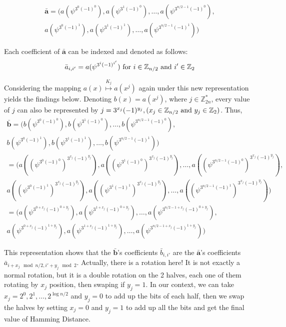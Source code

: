 \begin{description}
  \begin{align*}
       \mathbf{\bar{a}} = (a(\psi^{3^{0}(-1)^{0}}),a(\psi^{3^{1}(-1)^{0}}), \dots,
    a(\psi^{3^{n/2 -1}(-1)^{0}}), \\ a(\psi^{3^{0}(-1)^{1}}),
    a(\psi^{3^{1}(-1)^{1}}), \dots,a(\psi^{3^{n/2 -1}(-1)^{1}}))
  \end{align*}

  Each coefficient of \(\mathbf{\bar{a}}\) can be indexed and denoted as follows:
  \[
    \bar{a}_{i,i'} = a(\psi^{3^{i}(-1)^{i'}}) \textnormal{ for } i \in
    \mathbb{Z}_{n/2} \textnormal{ and } i' \in \mathbb{Z}_{2}
  \]

  Considering the mapping \(a(x) \stackrel{K_{j}}{\mapsto} a(x^{j})\) again under this new
  representation yields the findings below. Denoting \(b(x) = a(x^{j})\), where
  \(j \in \mathbb{Z}_{2n}^{*}\), every value of \(j\) can also be
  represented by
  \(j = 3^{x_{j}}(-1)^{y_{j}}, (x_{j} \in \mathbb{Z}_{n/2} \textnormal{ and }
  y_{j} \in \mathbb{Z}_{2})\). Thus,
  \begin{align*}
    \mathbf{\bar{b}} = (b(\psi^{3^{0}(-1)^{0}}),b(\psi^{3^{1}(-1)^{0}}), \dots,
    b(\psi^{3^{n/2 -1}(-1)^{0}}), \\ b(\psi^{3^{0}(-1)^{1}}),
    b(\psi^{3^{1}(-1)^{1}}), \dots,b(\psi^{3^{n/2 -1}(-1)^{1}}))\\
    = (a((\psi^{3^{0}(-1)^{0}})^{3^{x_{j}}(-1)^{y_{j}}}),a((\psi^{3^{1}(-1)^{0}})^{3^{x_{j}}(-1)^{y_{j}}}), \dots,
    a((\psi^{3^{n/2 -1}(-1)^{0}})^{3^{x_{j}}(-1)^{y_{j}}}), \\ a((\psi^{3^{0}(-1)^{1}})^{3^{x_{j}}(-1)^{y_{j}}}),
    a((\psi^{3^{1}(-1)^{1}})^{3^{x_{j}}(-1)^{y_{j}}}), \dots,a((\psi^{3^{n/2 -1}(-1)^{1}})^{3^{x_{j}}(-1)^{y_{j}}}))\\
    = (a(\psi^{3^{0 + x_{j}}(-1)^{0 + y_{j}}}), a(\psi^{3^{1 + x_{j}}(-1)^{0 + y_{j}}}), \dots,a(\psi^{3^{n/2 - 1 + x_{j}}(-1)^{0 + y_{j}}}),\\
    a(\psi^{3^{0 + x_{j}}(-1)^{1 + y_{j}}}), a(\psi^{3^{1 + x_{j}}(-1)^{1 + y_{j}}}), \dots, a(\psi^{3^{n/2 - 1 + x_{j}}(-1)^{1 + y_{j}}}))
  \end{align*}

  This representation shows that the \(\mathbf{\bar{b}}\)'s coefficients
  \(\bar{b}_{i,i'}\) are the \(\mathbf{\bar{a}}\)'s coefficients
  \(\bar{a}_{i+x_{j} \mod n/2, i' + y_{j} \mod 2}\). Actually, there is a
  rotation here! It is not exactly a normal rotation, but it is a double rotation on
  the 2 halves, each one of them rotating by \(x_{j}\) position, then swaping
  if \(y_{j} = 1\). In our context, we can take
  \(x_{j} = 2^{0}, 2^{1}, \dots, 2^{\log n/2}\) and \(y_{j} = 0\) to add up the
  bits of each half, then we swap the halves by setting \(x_{j} = 0\) and
  \(y_{j} = 1\) to add up all the bits and get the final value of Hamming
  Distance.
  

\end{description}
